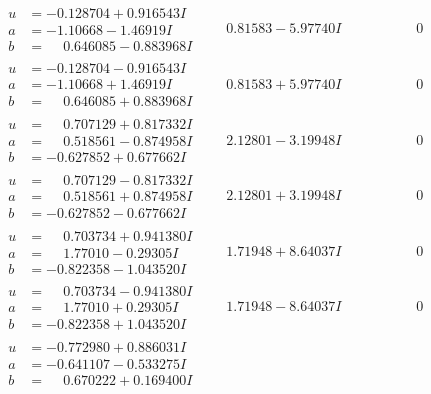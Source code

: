 \documentclass[1p]{elsarticle_modified}
\theoremstyle{definition}
\begin{document}
$$\begin{array}{c|c|c}
\begin{aligned}
u &= -0.128704 + 0.916543 I \\
a &= -1.10668 - 1.46919 I \\
b &= \phantom{-}0.646085 - 0.883968 I\end{aligned}
 & \phantom{-}0.81583 - 5.97740 I & \phantom{-0.000000 } 0 \\ \hline\begin{aligned}
u &= -0.128704 - 0.916543 I \\
a &= -1.10668 + 1.46919 I \\
b &= \phantom{-}0.646085 + 0.883968 I\end{aligned}
 & \phantom{-}0.81583 + 5.97740 I & \phantom{-0.000000 } 0 \\ \hline\begin{aligned}
u &= \phantom{-}0.707129 + 0.817332 I \\
a &= \phantom{-}0.518561 - 0.874958 I \\
b &= -0.627852 + 0.677662 I\end{aligned}
 & \phantom{-}2.12801 - 3.19948 I & \phantom{-0.000000 } 0 \\ \hline\begin{aligned}
u &= \phantom{-}0.707129 - 0.817332 I \\
a &= \phantom{-}0.518561 + 0.874958 I \\
b &= -0.627852 - 0.677662 I\end{aligned}
 & \phantom{-}2.12801 + 3.19948 I & \phantom{-0.000000 } 0 \\ \hline\begin{aligned}
u &= \phantom{-}0.703734 + 0.941380 I \\
a &= \phantom{-}1.77010 - 0.29305 I \\
b &= -0.822358 - 1.043520 I\end{aligned}
 & \phantom{-}1.71948 + 8.64037 I & \phantom{-0.000000 } 0 \\ \hline\begin{aligned}
u &= \phantom{-}0.703734 - 0.941380 I \\
a &= \phantom{-}1.77010 + 0.29305 I \\
b &= -0.822358 + 1.043520 I\end{aligned}
 & \phantom{-}1.71948 - 8.64037 I & \phantom{-0.000000 } 0 \\ \hline\begin{aligned}
u &= -0.772980 + 0.886031 I \\
a &= -0.641107 - 0.533275 I \\
b &= \phantom{-}0.670222 + 0.169400 I\end{aligned}

\end{array}$$
\end{document}
